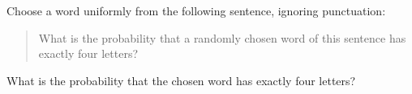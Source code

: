 Choose a word uniformly from the following sentence, ignoring punctuation: \begin{quote}What is the probability that a randomly chosen word of this sentence has exactly four letters?\end{quote} What is the probability that the chosen word has exactly four letters?
